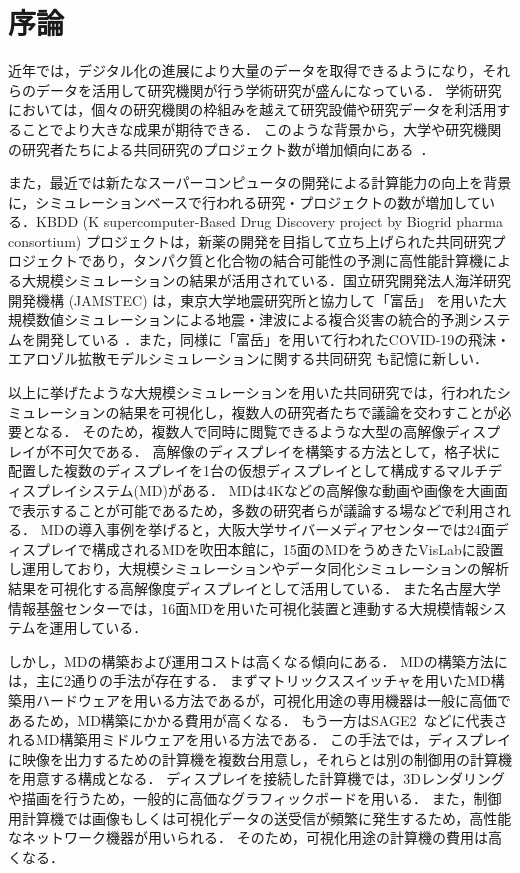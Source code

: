 \chapter{序論}

近年では，デジタル化の進展により大量のデータを取得できるようになり，それらのデータを活用して研究機関が行う学術研究が盛んになっている．
学術研究においては，個々の研究機関の枠組みを越えて研究設備や研究データを利活用することでより大きな成果が期待できる．
このような背景から，大学や研究機関の研究者たちによる共同研究のプロジェクト数が増加傾向にある~\cite{nisted,soumusyou}．

また，最近では新たなスーパーコンピュータの開発による計算能力の向上を背景に，シミュレーションベースで行われる研究・プロジェクトの数が増加している．KBDD (K supercomputer-Based Drug Discovery project by Biogrid pharma consortium) プロジェクト\cite{kbdd,kbddproject}は，新薬の開発を目指して立ち上げられた共同研究プロジェクトであり，タンパク質と化合物の結合可能性の予測に高性能計算機による大規模シミュレーションの結果が活用されている．国立研究開発法人海洋研究開発機構 (JAMSTEC) は，東京大学地震研究所と協力して「富岳」 \cite{fugaku}を用いた大規模数値シミュレーションによる地震・津波による複合災害の統合的予測システムを開発している \cite{jishin}．また，同様に「富岳」を用いて行われたCOVID-19の飛沫・エアロゾル拡散モデルシミュレーションに関する共同研究 \cite{covid-19}も記憶に新しい．

以上に挙げたような大規模シミュレーションを用いた共同研究では，行われたシミュレーションの結果を可視化し，複数人の研究者たちで議論を交わすことが必要となる．
そのため，複数人で同時に閲覧できるような大型の高解像ディスプレイが不可欠である．
高解像のディスプレイを構築する方法として，格子状に配置した複数のディスプレイを1台の仮想ディスプレイとして構成するマルチディスプレイシステム(MD)がある．
MDは4Kなどの高解像な動画や画像を大画面で表示することが可能であるため，多数の研究者らが議論する場などで利用される．
MDの導入事例を挙げると，大阪大学サイバーメディアセンターでは24面ディスプレイで構成されるMDを吹田本館に，15面のMDをうめきたVisLabに設置し運用しており，大規模シミュレーションやデータ同化シミュレーションの解析結果を可視化する高解像度ディスプレイとして活用している\cite{ciber_media}．
また名古屋大学情報基盤センターでは，16面MDを用いた可視化装置と連動する大規模情報システムを運用している\cite{nagoya}．

しかし，MDの構築および運用コストは高くなる傾向にある．
MDの構築方法には，主に2通りの手法が存在する．
まずマトリックススイッチャを用いたMD構築用ハードウェアを用いる方法であるが，可視化用途の専用機器は一般に高価であるため，MD構築にかかる費用が高くなる．
もう一方はSAGE2~\cite{sage2}などに代表されるMD構築用ミドルウェアを用いる方法である．
この手法では，ディスプレイに映像を出力するための計算機を複数台用意し，それらとは別の制御用の計算機を用意する構成となる．
ディスプレイを接続した計算機では，3Dレンダリングや描画を行うため，一般的に高価なグラフィックボードを用いる．
また，制御用計算機では画像もしくは可視化データの送受信が頻繁に発生するため，高性能なネットワーク機器が用いられる．
そのため，可視化用途の計算機の費用は高くなる．

